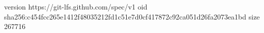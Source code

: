version https://git-lfs.github.com/spec/v1
oid sha256:c454fcc265e1412f48035212fd1c51e7d0cf417872c92ca051d26fa2073ea1bd
size 267716
